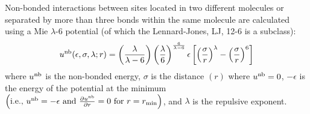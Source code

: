 \documentclass[journal=jced,manuscript=article]{achemso}
\begin{document}
    
    Non-bonded interactions between sites located in two different molecules or separated by more than three bonds within the same molecule are calculated using a Mie $\lambda$-6 potential (of which the Lennard-Jones, LJ, 12-6 is a subclass):
    \begin{equation} \label{eq:Mie}
    u^{\rm nb}(\epsilon,\sigma,\lambda;r) = \left(\frac{\lambda}{\lambda - 6}\right)\left(\frac{\lambda}{6}\right)^{\frac{6}{\lambda - 6}} \epsilon \left[\left(\frac{\sigma}{r}\right)^{\lambda} - \left(\frac{\sigma}{r}\right)^6\right]
    \end{equation} 
    where $u^{\rm nb}$ is the non-bonded energy, $\sigma$ is the distance $(r)$ where $u^{\rm nb} = 0$, $-\epsilon$ is the energy of the potential at the minimum $\left(\text{i.e., }u^{\rm nb} = -\epsilon \text{ and } \frac{\partial u^{\rm nb}}{\partial r} = 0 \text{ for } r=r_{\rm min} \right)$, and $\lambda$ is the repulsive exponent. 
    
\end{document}

